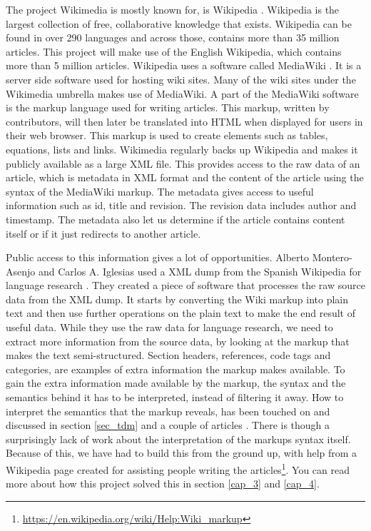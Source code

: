 The project Wikimedia is mostly known for, is Wikipedia \cite{wikipedia}. Wikipedia is the largest collection of free, collaborative knowledge that exists. Wikipedia can be found in over 290 languages and across those, contains more than 35 million articles. This project will make use of the English Wikipedia, which contains more than 5 million articles. Wikipedia uses a  software called MediaWiki \cite{mediawiki}. It is a server side software used for hosting wiki sites. Many of the wiki sites under the Wikimedia umbrella makes use of MediaWiki. A part of the MediaWiki software is the markup language used for writing articles. This markup, written by contributors, will then later be translated into HTML when displayed for users in their web browser. This markup is used to create elements such as tables, equations, lists and links. Wikimedia regularly backs up Wikipedia and makes it publicly available as a large XML file. This provides access to the raw data of an article, which is metadata in XML format and the content of the article using the syntax of the MediaWiki markup. The metadata gives access to useful information such as id, title and revision. The revision data includes author and timestamp. The metadata also let us determine if the article contains content itself or if it just redirects to another article.

Public access to this information gives a lot of opportunities. Alberto Montero-Asenjo and Carlos A. Iglesias used a XML dump from the Spanish Wikipedia for language research \cite{lr-wiki}. They created a piece of software that processes the raw source data from the XML dump. It starts by converting the Wiki markup into plain text and then use further operations on the plain text to make the end result of useful data. While they use the raw data for language research, we need to extract more information from the source data, by looking at the markup that makes the text semi-structured. Section headers, references, code tags and categories, are examples of extra information the markup makes available. 
To gain the extra information made available by the markup, the syntax and the semantics behind it has to be interpreted, instead of filtering it away.
How to interpret the semantics that the markup reveals, has been touched on and discussed in section \ref{sec_tdm} and a couple of articles \cite{text-cat} \cite{wlm}. There is though a surprisingly lack of work about the interpretation of the markups syntax itself. Because of this, we have had to build this from the ground up, with help from a Wikipedia page created for assisting people writing the articles\footnote{\url{https://en.wikipedia.org/wiki/Help:Wiki_markup}}. You can read more about how this project solved this in section \ref{cap_3} and \ref{cap_4}.

